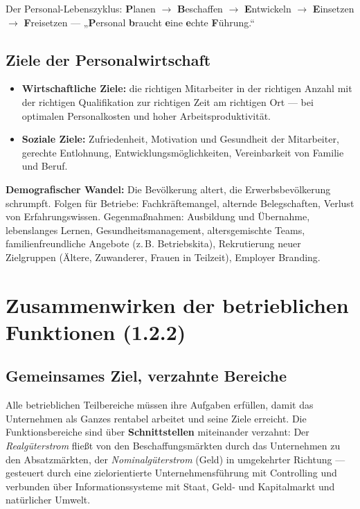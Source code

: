\documentclass[11pt, a4paper]{article}
\begin{document}
\begin{eselsbruecke}
Der Personal-Lebenszyklus: \textbf{P}lanen $\rightarrow$ \textbf{B}eschaffen $\rightarrow$
\textbf{E}ntwickeln $\rightarrow$ \textbf{E}insetzen $\rightarrow$ \textbf{F}reisetzen ---
„\textbf{P}ersonal \textbf{b}raucht \textbf{e}ine \textbf{e}chte \textbf{F}ührung.``
\end{eselsbruecke}

\subsection{Ziele der Personalwirtschaft}

\begin{itemize}
  \item \textbf{Wirtschaftliche Ziele:} die richtigen Mitarbeiter in der richtigen Anzahl
    mit der richtigen Qualifikation zur richtigen Zeit am richtigen Ort --- bei optimalen
    Personalkosten und hoher Arbeitsproduktivität.
  \item \textbf{Soziale Ziele:} Zufriedenheit, Motivation und Gesundheit der Mitarbeiter,
    gerechte Entlohnung, Entwicklungsmöglichkeiten, Vereinbarkeit von Familie und Beruf.
\end{itemize}

\begin{beispiel}
\textbf{Demografischer Wandel:} Die Bevölkerung altert, die Erwerbsbevölkerung schrumpft.
Folgen für Betriebe: Fachkräftemangel, alternde Belegschaften, Verlust von Erfahrungswissen.
Gegenmaßnahmen: Ausbildung und Übernahme, lebenslanges Lernen, Gesundheitsmanagement,
altersgemischte Teams, familienfreundliche Angebote (z.\,B. Betriebskita), Rekrutierung
neuer Zielgruppen (Ältere, Zuwanderer, Frauen in Teilzeit), Employer Branding.
\end{beispiel}

\section{Zusammenwirken der betrieblichen Funktionen (1.2.2)}

\subsection{Gemeinsames Ziel, verzahnte Bereiche}

Alle betrieblichen Teilbereiche müssen ihre Aufgaben erfüllen, damit das Unternehmen als
Ganzes rentabel arbeitet und seine Ziele erreicht. Die Funktionsbereiche sind über
\textbf{Schnittstellen} miteinander verzahnt: Der \emph{Realgüterstrom} fließt von den
Beschaffungsmärkten durch das Unternehmen zu den Absatzmärkten, der
\emph{Nominalgüterstrom} (Geld) in umgekehrter Richtung --- gesteuert durch eine
zielorientierte Unternehmensführung mit Controlling und verbunden über
Informationssysteme mit Staat, Geld- und Kapitalmarkt und natürlicher Umwelt.
\end{document}
